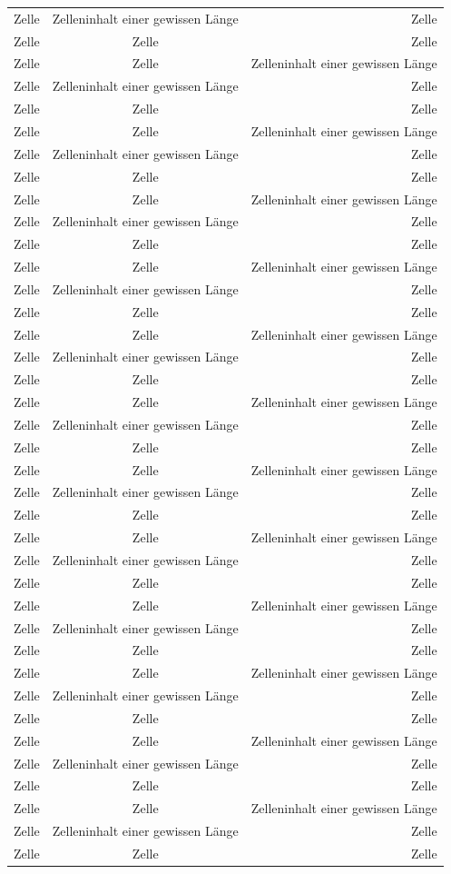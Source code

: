 \documentclass[ngerman]{scrartcl}
\begin{document}
\begin{longtabu}[l]{@{}lcr@{}}
		Zelle & Zelleninhalt einer gewissen Länge & Zelle\\
		Zelle & Zelle & Zelle\\
		Zelle & Zelle & Zelleninhalt einer gewissen Länge\\
		Zelle & Zelleninhalt einer gewissen Länge & Zelle\\
		Zelle & Zelle & Zelle\\
		Zelle & Zelle & Zelleninhalt einer gewissen Länge\\
		Zelle & Zelleninhalt einer gewissen Länge & Zelle\\
		Zelle & Zelle & Zelle\\
		Zelle & Zelle & Zelleninhalt einer gewissen Länge\\
		Zelle & Zelleninhalt einer gewissen Länge & Zelle\\
		Zelle & Zelle & Zelle\\
		Zelle & Zelle & Zelleninhalt einer gewissen Länge\\
		Zelle & Zelleninhalt einer gewissen Länge & Zelle\\
		Zelle & Zelle & Zelle\\
		Zelle & Zelle & Zelleninhalt einer gewissen Länge\\
		Zelle & Zelleninhalt einer gewissen Länge & Zelle\\
		Zelle & Zelle & Zelle\\
		Zelle & Zelle & Zelleninhalt einer gewissen Länge\\
		Zelle & Zelleninhalt einer gewissen Länge & Zelle\\
		Zelle & Zelle & Zelle\\
		Zelle & Zelle & Zelleninhalt einer gewissen Länge\\
		Zelle & Zelleninhalt einer gewissen Länge & Zelle\\
		Zelle & Zelle & Zelle\\
		Zelle & Zelle & Zelleninhalt einer gewissen Länge\\
		Zelle & Zelleninhalt einer gewissen Länge & Zelle\\
		Zelle & Zelle & Zelle\\
		Zelle & Zelle & Zelleninhalt einer gewissen Länge\\
		Zelle & Zelleninhalt einer gewissen Länge & Zelle\\
		Zelle & Zelle & Zelle\\
		Zelle & Zelle & Zelleninhalt einer gewissen Länge\\
		Zelle & Zelleninhalt einer gewissen Länge & Zelle\\
		Zelle & Zelle & Zelle\\
		Zelle & Zelle & Zelleninhalt einer gewissen Länge\\
		Zelle & Zelleninhalt einer gewissen Länge & Zelle\\
		Zelle & Zelle & Zelle\\
		Zelle & Zelle & Zelleninhalt einer gewissen Länge\\
		Zelle & Zelleninhalt einer gewissen Länge & Zelle\\
		Zelle & Zelle & Zelle\\
		\bottomrule
	\end{longtabu}
\end{document}
